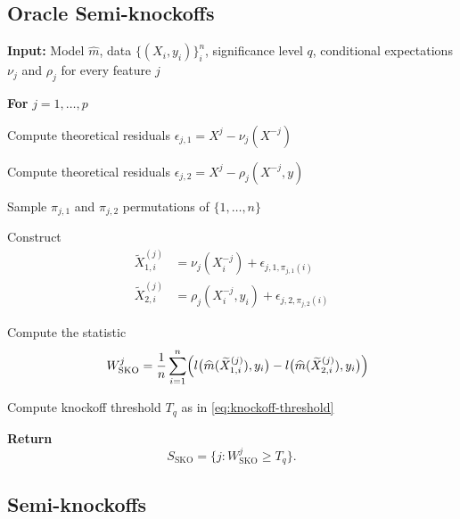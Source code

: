 \documentclass{article}
\theoremstyle{plain}
\theoremstyle{definition}
\theoremstyle{remark}
\begin{document}
\subsection{Oracle Semi-knockoffs}


\begin{algorithm}[H]
\caption{Oracle Semi-knockoffs (Semi-KO)}
\label{alg:semi_knockoffs_oracle}
\begin{algorithmic}[1]
\item[] \textbf{Input:} Model $\widehat{m}$, data $\{(X_i,y_i)\}_i^n$, significance level $q$, conditional expectations $\nu_j$ and $\rho_j $ for every feature $j$
\item[] \textbf{For} $j = 1,\dots,p$
    \item[] \quad Compute theoretical residuals $\epsilon_{j,1} = X^j -\nu_j(X^{-j})$
    \item[] \quad Compute theoretical residuals $\epsilon_{j,2} = X^j - \rho_j(X^{-j}, y)$
    \item[] \quad Sample $\pi_{j,1}$ and $\pi_{j,2}$ permutations of $\{1,\dots,n\}$
    \item[] \quad Construct 
    \begin{align*}
        \widetilde{X}^{(j)}_{1,i}
        &= \nu_j(X^{-j}_i)
        + \epsilon_{j,1,\pi_{j,1}(i)}\\
        \widetilde{X}^{(j)}_{2,i}
        &= \rho_j(X^{-j}_i, y_i)
        + \epsilon_{j,2,\pi_{j,2}(i)}
    \end{align*}
    \item[] \quad Compute the statistic %
    \[
    \quad W^j_\mathrm{SKO} = \frac{1}{n} \sum_{i=1}^{n}
    \Bigl( 
        l\bigl(\widehat{m}(\widetilde{X}^{(j)}_{1,i}), y_i\bigr)
        - 
        l\bigl(\widehat{m}(\widetilde{X}^{(j)}_{2,i}), y_i\bigr)
    \Bigr)
    \]
\item[] Compute knockoff threshold $T_q$ as in \eqref{eq:knockoff-threshold}
\item[] \textbf{Return} 
\[
S_{\mathrm{SKO}}
=
\bigl\{
j : W^j_\mathrm{SKO} \ge T_q
\bigr\}.
\]
\end{algorithmic}
\label{alg:theo-semi-KO}
\end{algorithm}

\subsection{Semi-knockoffs}
\end{document}
